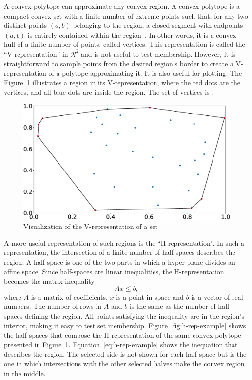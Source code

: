 A convex polytope can approximate any convex region. A convex polytope is a
compact convex set with a finite number of extreme points such that, for any two
distinct points \((a,b)\) belonging to the region, a closed segment with
endpoints \((a,b)\) is entirely contained within the
region~\parencite{grünbaum:convex}. In other words, it is a convex hull of a
finite number of points, called vertices. This representation is called the
\enquote{V-representation} in \(\mathcal{R}^{2}\) and is not useful to test
membership. However, it is straightforward to sample points from the desired
region's border to create a V-representation of a polytope approximating it. It
is also useful for plotting. The Figure~\ref{fig:v-rep-example} illustrates a
region in its V-representation, where the red dots are the vertices, and all
blue dots are inside the region. The set of vertices is
.

\begin{figure}[!htb]
  \centering
  \includegraphics[width=\linewidth]{imgs/v-rep}
  \caption{Visualization of the V-representation of a set}%
  \label{fig:v-rep-example}
\end{figure}

A more useful representation of such regions is the \enquote{H-representation}.
In such a representation, the intersection of a finite number of half-spaces
describes the region. A half-space is one of the two parts in which a
hyper-plane divides an affine space. Since half-spaces are linear inequalities,
the H-representation becomes the matrix inequality
%
\begin{equation}
  Ax\leq{}b,
\end{equation}
%
where \(A\) is a matrix of coefficients, \(x\) is a point in space and \(b\) is
a vector of real numbers. The number of rows in \(A\) and \(b\) is the same as
the number of half-spaces defining the region. All points satisfying the
inequality are in the region's interior, making it easy to test set membership.
Figure~\ref{fig:h-rep-example} shows the half-spaces that compose the
H-representation of the same convex polytope presented in
Figure~\ref{fig:v-rep-example}. Equation~\ref{eq:h-rep-example} shows the
inequation that describes the region. The selected side is not shown for each
half-space but is the one in which intersections with the other selected halves
make the convex region in the middle.

